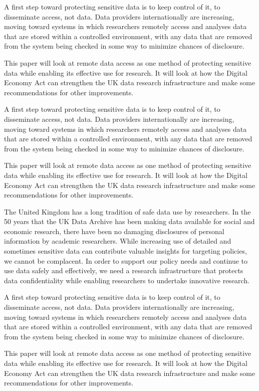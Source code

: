 \documentclass{CUP-JNL-DAP}%
\begin{document}
A first step toward protecting sensitive data is to keep control of it, to disseminate access, not data. Data
providers internationally are increasing, moving toward systems in which researchers remotely access and
analyses data that are stored within a controlled environment, with any data that are removed from the
system being checked in some way to minimize chances of disclosure.

This paper will look at remote data access as one method of protecting sensitive data while enabling its
effective use for research. It will look at how the Digital Economy Act can strengthen the UK data research
infrastructure and make some recommendations for other improvements.


A first step toward protecting sensitive data is to keep control of it, to disseminate access, not data. Data
providers internationally are increasing, moving toward systems in which researchers remotely access and
analyses data that are stored within a controlled environment, with any data that are removed from the
system being checked in some way to minimize chances of disclosure.

This paper will look at remote data access as one method of protecting sensitive data while enabling its
effective use for research. It will look at how the Digital Economy Act can strengthen the UK data research
infrastructure and make some recommendations for other improvements.

The United Kingdom has a long tradition of safe data use by researchers. In the 50 years that the UK
Data Archive has been making data available for social and economic research, there have been no
damaging disclosures of personal information by academic researchers. While increasing use of detailed and sometimes sensitive
data can contribute valuable insights for targeting policies, we cannot be
complacent. In order to support our policy needs and continue to use data safely and effectively, we
need a research infrastructure that protects data confidentiality while enabling researchers to undertake
innovative research.

A first step toward protecting sensitive data is to keep control of it, to disseminate access, not data. Data
providers internationally are increasing, moving toward systems in which researchers remotely access and
analyses data that are stored within a controlled environment, with any data that are removed from the
system being checked in some way to minimize chances of disclosure.

This paper will look at remote data access as one method of protecting sensitive data while enabling its
effective use for research. It will look at how the Digital Economy Act can strengthen the UK data research
infrastructure and make some recommendations for other improvements.
\end{document}
